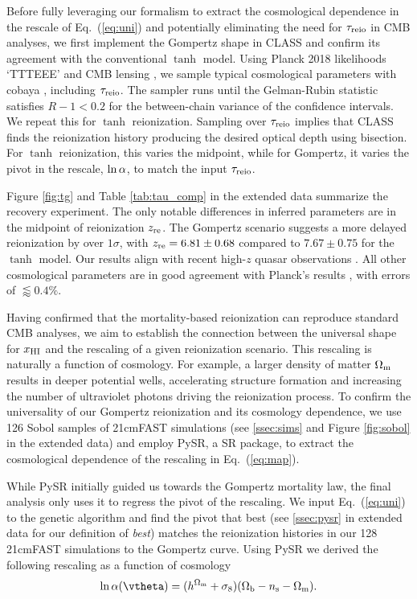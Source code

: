 Before fully leveraging our formalism to extract the cosmological
dependence in the rescale of Eq.~(\ref{eq:uni}) and potentially
eliminating the need for $\tau_{\mathrm{reio}}$ in CMB analyses, we first
implement the Gompertz shape in CLASS and confirm its agreement with the
conventional $\tanh$ model.
Using Planck 2018 likelihoods `TTTEEE' \cite{Planck2020c} and CMB
lensing \cite{Planck2020d}, we sample typical cosmological parameters
with cobaya \cite{Torrado2020}, including $\tau_{\mathrm{reio}}$.
The sampler runs until the Gelman-Rubin statistic \cite{Lewis2013}
satisfies $R - 1 < 0.2$ for the between-chain variance of the confidence
intervals.
We repeat this for $\tanh$ reionization.
Sampling over $\tau_{\mathrm{reio}}$ implies that CLASS finds the reionization
history producing the desired optical depth using bisection.
For $\tanh$ reionization, this varies the midpoint, while for Gompertz,
it varies the pivot in the rescale, $\ln\alpha$, to match the input
$\tau_{\mathrm{reio}}$.

Figure \ref{fig:tg} and Table \ref{tab:tau_comp} in the extended data
summarize the recovery experiment.
The only notable differences in inferred parameters are in the midpoint
of reionization $z_{\mathrm{re}}$.
The Gompertz scenario suggests a more delayed reionization by over
$1\sigma$, with $z_{\mathrm{re}} = 6.81 \pm 0.68$ compared to $7.67 \pm 0.75$ for
the $\tanh$ model.
Our results align with recent high-$z$ quasar observations
\cite{Keating2020}.
All other cosmological parameters are in good agreement with Planck's
results \cite{Planck2020a}, with errors of $\lessapprox 0.4 \%$.

Having confirmed that the mortality-based reionization can reproduce
standard CMB analyses, we aim to establish the connection between the
universal shape for $x_{\mathrm{HI}}$ and the rescaling of  a given reionization
scenario.
This rescaling is naturally a function of cosmology.
For example, a larger density of matter $\Omega_\mathrm{m}$ results in deeper
potential wells, accelerating structure formation and increasing the
number of ultraviolet photons driving the reionization process.
To confirm the universality of our Gompertz reionization and its
cosmology dependence, we use 126 Sobol samples of 21cmFAST simulations
(see \ref{ssec:sims} and Figure \ref{fig:sobol} in the extended data)
and employ PySR, a SR package, to extract the cosmological dependence of
the rescaling in Eq.~(\ref{eq:map}).

While PySR initially guided us towards the Gompertz mortality law, the
final analysis only uses it to regress the pivot of the rescaling.
We input Eq.~(\ref{eq:uni}) to the genetic algorithm and find the pivot
that best (see \ref{ssec:pysr} in extended data for our definition of
\emph{best}) matches the reionization histories in our 128 21cmFAST
simulations to the Gompertz curve.
Using PySR we derived the following rescaling as a function of cosmology
%
\begin{equation}
\label{eq:SR}
\ln\ap(\vtheta) = (h^{\Omegam} + \sigma_8) (\Omegab - \ns - \Omegam).
\end{equation}

